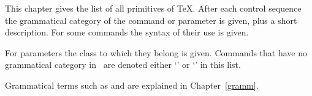 

This chapter gives the list of all primitives of
\TeX. After each control sequence
the grammatical category of the command or parameter
is given, plus a short description. For some  commands
the syntax of their use is given.

For parameters the class to which they belong is given.
Commands that have no grammatical category
in \TeXbook\ are denoted either
`' or
`' in this list.

Grammatical terms such as  and 
are explained in Chapter~\ref{gramm}.

